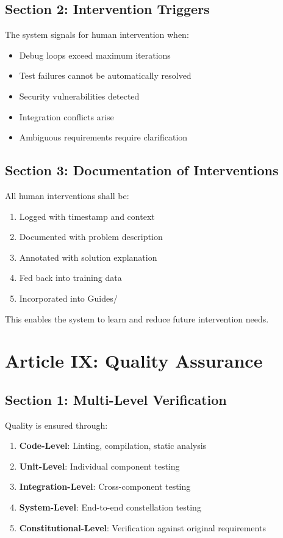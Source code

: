 \documentclass[12pt,letterpaper]{article}
\begin{document}
\subsection{Section 2: Intervention Triggers}

The system signals for human intervention when:

\begin{itemize}
    \item Debug loops exceed maximum iterations
    \item Test failures cannot be automatically resolved
    \item Security vulnerabilities detected
    \item Integration conflicts arise
    \item Ambiguous requirements require clarification
\end{itemize}

\subsection{Section 3: Documentation of Interventions}

All human interventions shall be:

\begin{enumerate}
    \item Logged with timestamp and context
    \item Documented with problem description
    \item Annotated with solution explanation
    \item Fed back into training data
    \item Incorporated into Guides/
\end{enumerate}

This enables the system to learn and reduce future intervention needs.

\section{Article IX: Quality Assurance}

\subsection{Section 1: Multi-Level Verification}

Quality is ensured through:

\begin{enumerate}
    \item \textbf{Code-Level}: Linting, compilation, static analysis
    \item \textbf{Unit-Level}: Individual component testing
    \item \textbf{Integration-Level}: Cross-component testing
    \item \textbf{System-Level}: End-to-end constellation testing
    \item \textbf{Constitutional-Level}: Verification against original requirements
\end{enumerate}
\end{document}
